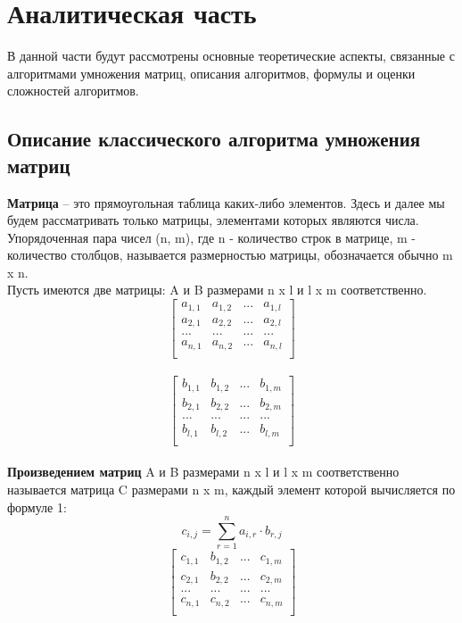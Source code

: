 \documentclass[a4paper,12pt]{article}
\begin{document}
	\newpage
	\section{Аналитическая часть}
	
	\hfill
	
	В данной части будут рассмотрены основные теоретические аспекты, связанные с алгоритмами умножения матриц, описания алгоритмов, формулы и оценки сложностей алгоритмов.
	
	\subsection{Описание классического алгоритма умножения матриц}
	\hfill
	
	\textbf{Матрица} – это прямоугольная таблица каких-либо элементов. Здесь и далее мы будем рассматривать только матрицы, элементами которых являются числа. Упорядоченная пара чисел (n, m), где n - количество строк в матрице, m - количество столбцов, называется размерностью матрицы, обозначается обычно m x n.\\
	Пусть имеются две матрицы: A и B размерами n x l и l x m соответственно.\\
	\[ \begin{bmatrix}
		a_{1,1} & a_{1,2} & ... & a_{1,l} \\
		a_{2,1} & a_{2,2} & ... & a_{2,l}\\		
		... & ... & ... & ... \\
		a_{n,1} & a_{n, 2} & ... & a_{n,l} \\
	\end{bmatrix} \]\\
	\[ \begin{bmatrix}
		b_{1,1} & b_{1,2} & ... & b_{1,m} \\
		b_{2,1} & b_{2,2} & ... & b_{2,m}\\		
		... & ... & ... & ... \\
		b_{l,1} & b_{l, 2} & ... & b_{l,m} \\
	\end{bmatrix} \]\\
	
	
	\textbf{Произведением матриц} A и B размерами n x l и l x m соответственно называется матрица C размерами n x m, каждый элемент которой вычисляется по формуле 1:\\
	\begin{equation}
		c_{i,j} = \sum\limits_{r=1}^n a_{i,r}\cdot b_{r,j}
	\end{equation}		
	\[ \begin{bmatrix}
		c_{1,1} & b_{1,2} & ... & c_{1,m} \\
		c_{2,1} & b_{2,2} & ... & c_{2,m}\\		
		... & ... & ... & ... \\
		c_{n,1} & c_{n, 2} & ... & c_{n,m} \\
	\end{bmatrix} \]\\
	
\end{document}
